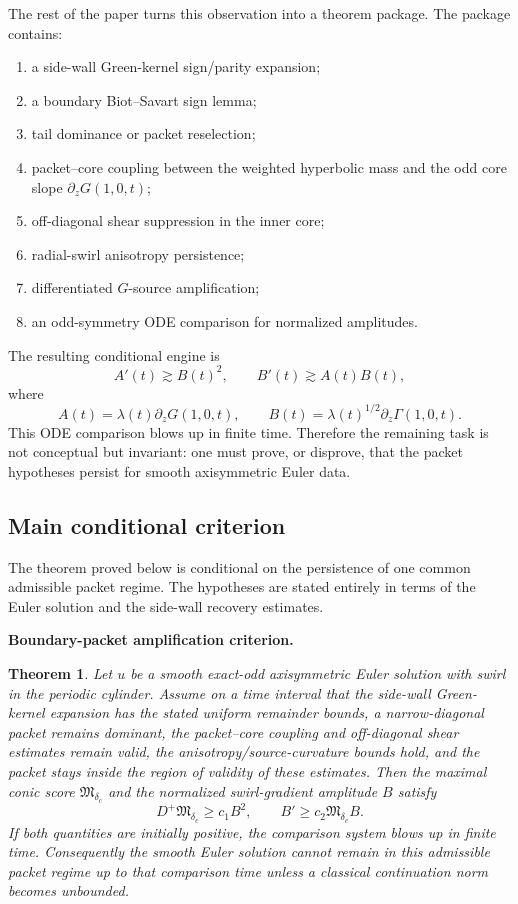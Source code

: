 \documentclass[11pt]{amsart}
\newtheorem{theorem}{Theorem}[section]
\begin{document}
The rest of the paper turns this observation into a theorem package.  The package contains:
\begin{enumerate}[label=(\roman*)]
\item a side-wall Green-kernel sign/parity expansion;
\item a boundary Biot--Savart sign lemma;
\item tail dominance or packet reselection;
\item packet--core coupling between the weighted hyperbolic mass and the odd core slope \(\partial_zG(1,0,t)\);
\item off-diagonal shear suppression in the inner core;
\item radial-swirl anisotropy persistence;
\item differentiated \(G\)-source amplification;
\item an odd-symmetry ODE comparison for normalized amplitudes.
\end{enumerate}
The resulting conditional engine is
\begin{equation}\label{eq:ODE_engine_intro}
A'(t)\gtrsim B(t)^2,
\qquad
B'(t)\gtrsim A(t)B(t),
\end{equation}
where
\begin{equation}\label{eq:A_B_intro}
A(t)=\lambda(t)\partial_zG(1,0,t),
\qquad
B(t)=\lambda(t)^{1/2}\partial_z\Gamma(1,0,t).
\end{equation}
This ODE comparison blows up in finite time.  Therefore the remaining task is not conceptual but invariant: one must prove, or disprove, that the packet hypotheses persist for smooth axisymmetric Euler data.


\subsection{Main conditional criterion}
The theorem proved below is conditional on the persistence of one common admissible packet regime.  The hypotheses are stated entirely in terms of the Euler solution and the side-wall recovery estimates.

\medskip
\noindent\textbf{Boundary-packet amplification criterion.}
\begin{theorem}\label{thm:intro_main_exact_odd}
Let $u$ be a smooth exact-odd axisymmetric Euler solution with swirl in the periodic cylinder.  Assume on a time interval that the side-wall Green-kernel expansion has the stated uniform remainder bounds, a narrow-diagonal packet remains dominant, the packet--core coupling and off-diagonal shear estimates remain valid, the anisotropy/source-curvature bounds hold, and the packet stays inside the region of validity of these estimates.  Then the maximal conic score $\mathfrak M_{\delta_c}$ and the normalized swirl-gradient amplitude $B$ satisfy
\[
D^+\mathfrak M_{\delta_c}\ge c_1B^2,
\qquad
B'\ge c_2\mathfrak M_{\delta_c}B.
\]
If both quantities are initially positive, the comparison system blows up in finite time.  Consequently the smooth Euler solution cannot remain in this admissible packet regime up to that comparison time unless a classical continuation norm becomes unbounded.
\end{theorem}
\end{document}
